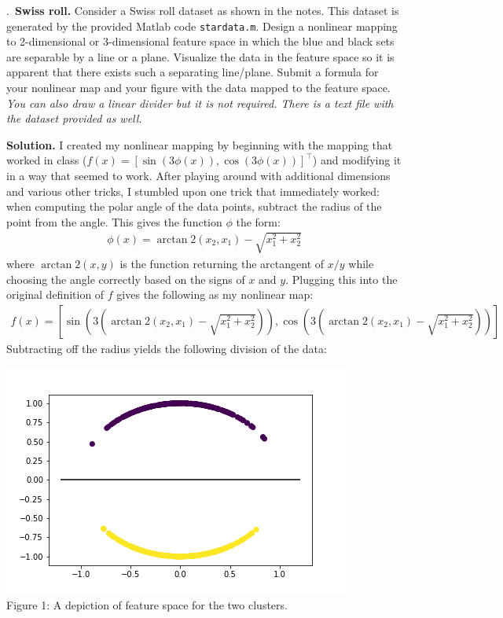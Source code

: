 \documentclass{letter}
\newcounter{problem}
\newcommand{\Problem}[2]{%
	\stepcounter{problem}%
	\leftskip=0pt%
	\theproblem.~\textbf{{#1.}} #2 \par%
}
\newcommand{\Solution}[1]{%
	\textbf{Solution.} #1 \par%
}
\newcommand{\T}{\intercal}
\begin{document}
    \Problem{Swiss roll}{Consider a Swiss roll dataset as shown in the notes. This dataset is generated by the provided Matlab code \lstinline{stardata.m}. Design a nonlinear mapping to 2-dimensional or 3-dimensional feature space in which the blue and black sets are separable by a line or a plane. Visualize the data in the feature space so it is apparent that there exists such a separating line/plane. Submit a formula for your nonlinear map and your figure with the data mapped to the feature space. \emph{You can also draw a linear divider but it is not required. There is a text file with the dataset provided as well.}}
    \Solution{I created my nonlinear mapping by beginning with the mapping that worked in class ($f(x) = [\sin(3\phi(x)), \cos(3\phi(x))]^\T$) and modifying it in a way that seemed to work. After playing around with additional dimensions and various other tricks, I stumbled upon one trick that immediately worked: when computing the polar angle of the data points, subtract the radius of the point from the angle. This gives the function $\phi$ the form: \begin{align*}
        \phi(x) = \arctan 2(x_2, x_1) - \sqrt{x_1^2 + x_2^2}
    \end{align*} where $\arctan 2(x,y)$ is the function returning the arctangent of $x/y$ while choosing the angle correctly based on the signs of $x$ and $y$. Plugging this into the original definition of $f$ gives the following as my nonlinear map: \begin{align*}
        f(x) = [\sin(3(\arctan 2(x_2, x_1) - \sqrt{x_1^2 + x_2^2})), \cos(3(\arctan 2(x_2, x_1) - \sqrt{x_1^2 + x_2^2}))] 
    \end{align*} Subtracting off the radius yields the following division of the data: 
    \begin{center}
        \includegraphics{feature-space.png} \\
        Figure 1: A depiction of feature space for the two clusters.
    \end{center}}
\end{document}
